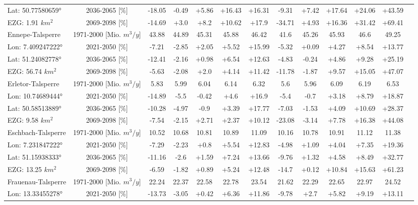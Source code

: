 \begin{longtable}{@{\extracolsep{\fill}}lc|ccccc||cccccc}
Lat: 50.77580659° & 2036-2065 [\%]  & -18.05 & -0.49 & +5.86 & +16.43 & +16.31 & -9.31 & +7.42 & +17.64 & +24.06 & +43.59 & \\ 
EZG: 1.91 $km^2$ & 2069-2098 [\%]  & -14.69 & +3.0 & +8.2 & +10.62 & +17.9 & -34.71 & +4.93 & +16.36 & +31.42 & +69.41 & \\ 
\hline 
Ennepe-Talsperre & 1971-2000 [Mio. $m^3/y$]  & 43.88 & 44.89 & 45.31 & 45.88 & 46.42 & 41.6 & 45.26 & 45.93 & 46.6 & 49.25 & \\ 
\cline{2-13} 
Lon: 7.409247222° & 2021-2050 [\%]  & -7.21 & -2.85 & +2.05 & +5.52 & +15.99 & -5.32 & +0.09 & +4.27 & +8.54 & +13.77 & \\ 
Lat: 51.24082778° & 2036-2065 [\%]  & -12.41 & -2.16 & +0.98 & +6.54 & +12.63 & -4.83 & -0.24 & +4.86 & +9.28 & +25.19 & \\ 
EZG: 56.74 $km^2$ & 2069-2098 [\%]  & -5.63 & -2.08 & +2.0 & +4.14 & +11.42 & -11.78 & -1.87 & +9.57 & +15.05 & +47.07 & \\ 
\hline 
Erletor-Talsperre & 1971-2000 [Mio. $m^3/y$]  & 5.83 & 5.99 & 6.04 & 6.14 & 6.32 & 5.6 & 5.96 & 6.09 & 6.19 & 6.53 & \\ 
\cline{2-13} 
Lon: 10.74689444° & 2021-2050 [\%]  & -14.89 & -5.5 & -0.42 & +4.6 & +16.9 & -5.4 & -0.7 & +3.18 & +8.79 & +18.87 & \\ 
Lat: 50.58513889° & 2036-2065 [\%]  & -10.28 & -4.97 & -0.9 & +3.39 & +17.77 & -7.03 & -1.53 & +4.09 & +10.69 & +28.37 & \\ 
EZG: 9.58 $km^2$ & 2069-2098 [\%]  & -7.54 & -2.15 & +2.71 & +2.37 & +10.12 & -23.08 & -3.14 & +7.78 & +16.38 & +44.08 & \\ 
\hline 
Eschbach-Talsperre & 1971-2000 [Mio. $m^3/y$]  & 10.52 & 10.68 & 10.81 & 10.89 & 11.09 & 10.16 & 10.78 & 10.91 & 11.12 & 11.38 & \\ 
\cline{2-13} 
Lon: 7.231847222° & 2021-2050 [\%]  & -7.29 & -2.23 & +0.8 & +5.54 & +12.83 & -4.98 & +1.09 & +4.04 & +7.35 & +19.36 & \\ 
Lat: 51.15938333° & 2036-2065 [\%]  & -11.16 & -2.6 & +1.59 & +7.24 & +13.66 & -9.76 & +1.32 & +4.58 & +8.49 & +32.77 & \\ 
EZG: 13.25 $km^2$ & 2069-2098 [\%]  & -6.59 & -1.82 & +0.89 & +5.24 & +12.48 & -14.7 & +0.12 & +10.84 & +15.63 & +61.23 & \\ 
\hline 
Frauenau-Talsperre & 1971-2000 [Mio. $m^3/y$]  & 22.24 & 22.37 & 22.58 & 22.78 & 23.54 & 21.62 & 22.29 & 22.65 & 22.97 & 24.52 & \\ 
\cline{2-13} 
Lon: 13.33455278° & 2021-2050 [\%]  & -13.73 & -3.05 & +0.42 & +6.36 & +11.86 & -9.78 & +2.7 & +5.82 & +9.19 & +13.11 & \\ 

\end{longtable}
